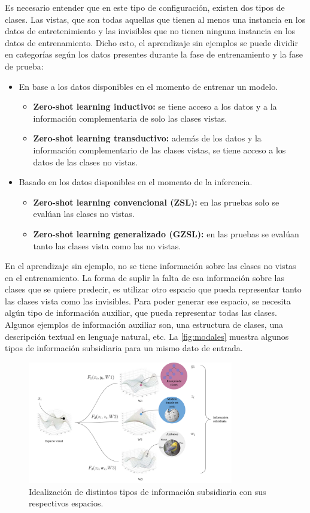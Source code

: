 Es necesario entender que en este tipo de configuración, existen dos tipos de clases. Las vistas, que son todas aquellas que tienen al menos una instancia en los datos de entretenimiento y las invisibles que no tienen ninguna instancia en los datos de entrenamiento. Dicho esto, el aprendizaje sin ejemplos se puede dividir en categorías según los datos presentes durante la fase de entrenamiento y la fase de prueba:
\begin{itemize}
	\item En base a los datos disponibles en el momento de entrenar un modelo.
	\begin{itemize}
		\item \textbf{Zero-shot learning inductivo:} se tiene acceso a los datos y a la información complementaria de solo las clases vistas.
		\item \textbf{Zero-shot learning transductivo:} además de los datos y la información complementario de las clases vistas,  se tiene acceso a los datos de las clases no vistas.
	\end{itemize}
	\item Basado en los datos disponibles en el momento de la inferencia.
	\begin{itemize}
		\item \textbf{Zero-shot learning convencional (ZSL):} en las pruebas solo se evalúan las clases no vistas.
		\item \textbf{Zero-shot learning generalizado (GZSL):} en las pruebas se evalúan tanto las clases vista como las no vistas.
	\end{itemize}
\end{itemize}

En el aprendizaje sin ejemplo, no se tiene información sobre las clases no vistas en el entrenamiento. La forma de suplir la falta de esa información sobre las clases que se quiere predecir, es utilizar otro espacio que pueda representar tanto las clases vista como las invisibles. Para poder generar ese espacio, se necesita algún tipo de información auxiliar, que pueda representar todas las clases.
Algunos ejemplos de información auxiliar son, una estructura de clases, una descripción textual en lenguaje natural, etc. La \autoref{fig:modales} muestra algunos tipos de información subsidiaria para un mismo dato de entrada.

\begin{figure}[]
	\centering
	\includegraphics[width=0.8\textwidth]{img/modales.png}
	\caption{Idealización de distintos tipos de información subsidiaria con sus respectivos espacios.}
	\label{fig:modales}
\end{figure}

